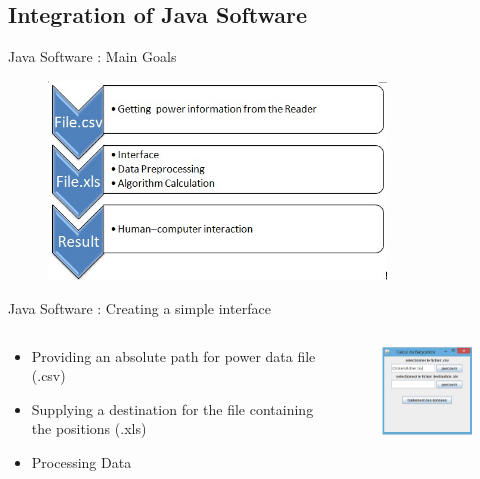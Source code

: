 \documentclass[utf8,compress]{beamer}
\begin{document}
\subsection{Integration of Java Software}
\begin{frame}[containsverbatim]{Java Software : Main Goals}
\begin{figure}[h]
    \center
    \includegraphics[width=0.8\textwidth]{prog_plan.jpg}
\end{figure}
 \end{frame}

\begin{frame}[containsverbatim]{Java Software : Creating a simple interface}

\begin{columns}

\begin{column}{0.5\textwidth}
    \begin{itemize}
    \item Providing an absolute path for power data file (.csv)
\vspace{0.8em} 
    \item Supplying a destination for the file containing the positions (.xls)
\vspace{0.8em} 
    \item Processing Data
\vspace{0.8em} 
    \end{itemize}
\end{column}

\begin{column}{0.5\textwidth}
    \begin{figure}[h]
       \includegraphics[width=4cm]{java.png}
    \end{figure}
\end{column}
\end{columns}
\vspace{1em}
\end{frame}
\end{document}
